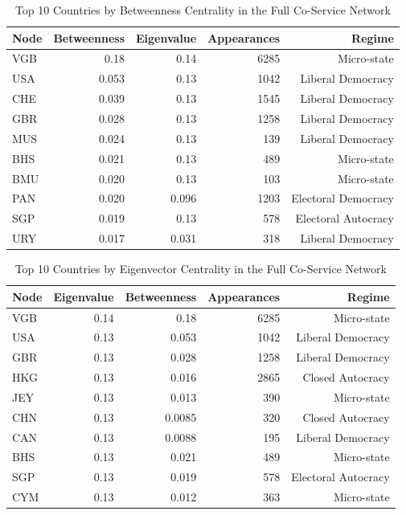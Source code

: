 \begin{table}[htbp]
\centering
\caption{Top 10 Countries by Betweenness Centrality in the Full Co-Service Network}
\label{tab:appendix_country_betweenness_app}
\begin{tabular}{lrrrr}
\toprule
Node & Betweenness & Eigenvalue & Appearances & Regime              \\
\midrule
VGB  & 0.18    & 0.14    & 6285        & Micro-state         \\
USA  & 0.053    & 0.13    & 1042        & Liberal Democracy   \\
CHE  & 0.039    & 0.13    & 1545        & Liberal Democracy   \\
GBR  & 0.028    & 0.13    & 1258        & Liberal Democracy   \\
MUS  & 0.024    & 0.13    & 139         & Liberal Democracy   \\
BHS  & 0.021    & 0.13    & 489         & Micro-state         \\
BMU  & 0.020    & 0.13    & 103         & Micro-state         \\
PAN  & 0.020    & 0.096    & 1203        & Electoral Democracy \\
SGP  & 0.019    & 0.13    & 578         & Electoral Autocracy \\
URY  & 0.017    & 0.031    & 318         & Liberal Democracy   \\
\bottomrule
\end{tabular}
\end{table}

\begin{table}[htbp]
\centering
\caption{Top 10 Countries by Eigenvector Centrality in the Full Co-Service Network}
\label{tab:appendix_country_eigenvector_app}
\begin{tabular}{lrrrr}
\toprule
Node & Eigenvalue & Betweenness & Appearances & Regime              \\
\midrule
VGB  & 0.14    & 0.18    & 6285        & Micro-state         \\
USA  & 0.13    & 0.053    & 1042        & Liberal Democracy   \\
GBR  & 0.13    & 0.028    & 1258        & Liberal Democracy   \\
HKG  & 0.13    & 0.016    & 2865        & Closed Autocracy    \\
JEY  & 0.13    & 0.013    & 390         & Micro-state         \\
CHN  & 0.13    & 0.0085    & 320         & Closed Autocracy    \\
CAN  & 0.13    & 0.0088    & 195         & Liberal Democracy   \\
BHS  & 0.13    & 0.021    & 489         & Micro-state         \\
SGP  & 0.13    & 0.019    & 578         & Electoral Autocracy \\
CYM  & 0.13    & 0.012    & 363         & Micro-state         \\
\bottomrule
\end{tabular}
\end{table}

